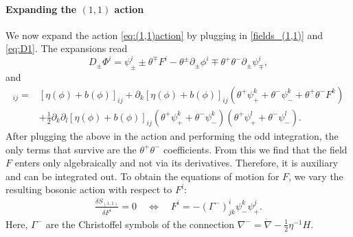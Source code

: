 \documentclass[letterpaper,12pt]{article}
\newcommand{\lc}{\mathring{\n}}
\newcommand{\p}{\partial}
\newcommand{\n}{\nabla}
\theoremstyle{definition}
\theoremstyle{remark}
\theoremstyle{examples}
\begin{document}
\paragraph{Expanding the $(1,1)$ action}
We now expand the action \eqref{eq:(1,1)action} by plugging in \eqref{fields_(1,1)} and \eqref{eq:D1}. The expansions read
\[
D_\pm\Phi^i =\psi^i_\pm\pm\theta^\mp F^i-\theta^\pm\p_\pm\phi^i\mp\theta^+\theta^-\p_\pm\psi^i_\mp,
\]
and
\begin{align*}
[\eta(\Phi)+b(\Phi)]_{ij} = & [\eta(\phi)+b(\phi)]_{ij}+\p_k[\eta(\phi)+b(\phi)]_{ij}(\theta^+\psi_+^k+\theta^-\psi_-^k+\theta^+\theta^-F^k)\\
& +\frac{1}{2}\p_k\p_l[\eta(\phi)+b(\phi)]_{ij}(\theta^+\psi_+^k+\theta^-\psi_-^k)(\theta^+\psi_+^l+\theta^-\psi_-^l).
\end{align*}
After plugging the above in the action and performing the odd integration, the only terms that survive are the $\theta^+\theta^-$ coefficients. From this we find that
the field $F$ enters only algebraically and not via its derivatives. Therefore, it is auxiliary and can be integrated out. To obtain the equations of motion for $F$,
we vary the resulting bosonic action with respect to $F^i$:
\begin{align} \label{F_EoM}
\frac{\delta S_{(1,1)}}{\delta F^i}=0\quad \Longleftrightarrow\quad  F^i=-(\Gamma^-)^i_{jk}\psi^k_-\psi^j_+.
\end{align}
Here, $\Gamma^-$ are the Christoffel symbols of the connection $\n^-=\lc-\frac{1}{2}\eta^{-1}H$.
\end{document}

